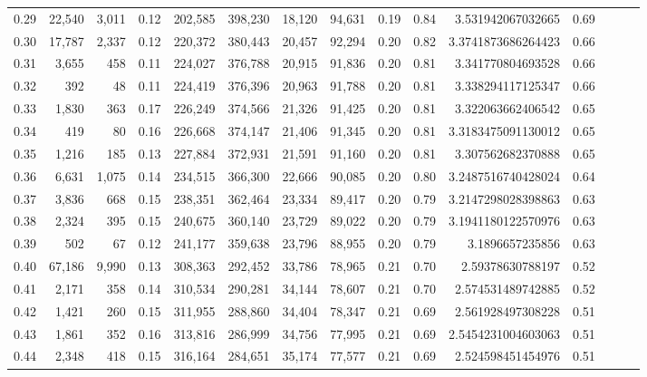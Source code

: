 \begin{tabular}{rrrrrrrrrrrrrrr}
0.29 &  22,540 &   3,011 &  0.12 &  202,585 &  398,230 &   18,120 &   94,631 &  0.19 &  0.84 &    3.531942067032665 &      0.69 \\
0.30 &  17,787 &   2,337 &  0.12 &  220,372 &  380,443 &   20,457 &   92,294 &  0.20 &  0.82 &   3.3741873686264423 &      0.66 \\
0.31 &   3,655 &     458 &  0.11 &  224,027 &  376,788 &   20,915 &   91,836 &  0.20 &  0.81 &    3.341770804693528 &      0.66 \\
0.32 &     392 &      48 &  0.11 &  224,419 &  376,396 &   20,963 &   91,788 &  0.20 &  0.81 &    3.338294117125347 &      0.66 \\
0.33 &   1,830 &     363 &  0.17 &  226,249 &  374,566 &   21,326 &   91,425 &  0.20 &  0.81 &    3.322063662406542 &      0.65 \\
0.34 &     419 &      80 &  0.16 &  226,668 &  374,147 &   21,406 &   91,345 &  0.20 &  0.81 &   3.3183475091130012 &      0.65 \\
0.35 &   1,216 &     185 &  0.13 &  227,884 &  372,931 &   21,591 &   91,160 &  0.20 &  0.81 &    3.307562682370888 &      0.65 \\
0.36 &   6,631 &   1,075 &  0.14 &  234,515 &  366,300 &   22,666 &   90,085 &  0.20 &  0.80 &   3.2487516740428024 &      0.64 \\
0.37 &   3,836 &     668 &  0.15 &  238,351 &  362,464 &   23,334 &   89,417 &  0.20 &  0.79 &   3.2147298028398863 &      0.63 \\
0.38 &   2,324 &     395 &  0.15 &  240,675 &  360,140 &   23,729 &   89,022 &  0.20 &  0.79 &   3.1941180122570976 &      0.63 \\
0.39 &     502 &      67 &  0.12 &  241,177 &  359,638 &   23,796 &   88,955 &  0.20 &  0.79 &      3.1896657235856 &      0.63 \\
0.40 &  67,186 &   9,990 &  0.13 &  308,363 &  292,452 &   33,786 &   78,965 &  0.21 &  0.70 &     2.59378630788197 &      0.52 \\
0.41 &   2,171 &     358 &  0.14 &  310,534 &  290,281 &   34,144 &   78,607 &  0.21 &  0.70 &    2.574531489742885 &      0.52 \\
0.42 &   1,421 &     260 &  0.15 &  311,955 &  288,860 &   34,404 &   78,347 &  0.21 &  0.69 &    2.561928497308228 &      0.51 \\
0.43 &   1,861 &     352 &  0.16 &  313,816 &  286,999 &   34,756 &   77,995 &  0.21 &  0.69 &   2.5454231004603063 &      0.51 \\
0.44 &   2,348 &     418 &  0.15 &  316,164 &  284,651 &   35,174 &   77,577 &  0.21 &  0.69 &    2.524598451454976 &      0.51 \\

\end{tabular}
